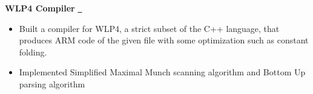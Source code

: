 \textbf{WLP4 Compiler} \href{https://gitfront.io/r/ininicho/pjpiqr4YskSL/compiler/}{\github\ } \par
\begin{itemize}
	\item Built a compiler for WLP4, a strict subset of the C++ language, that produces ARM code of the given file with some optimization such as constant folding. 
  \item Implemented Simplified Maximal Munch scanning algorithm and Bottom Up parsing algorithm
\end{itemize}
\vspace{0.1cm} \par
